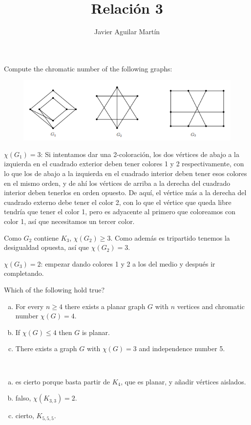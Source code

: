 \documentclass[twoside]{article}
\begin{document}
\title{Relación 3}
\author{Javier Aguilar Martín}
\maketitle


\begin{ejercicio}{3.1}
Compute the chromatic number of the following graphs:

\begin{figure}[h!]
\includegraphics[scale=0.7]{grafos31}
\end{figure}
\end{ejercicio}
\begin{solucion}
$\chi(G_1)=3$: Si intentamos dar una 2-coloración, los dos vértices de abajo a la izquierda en el cuadrado exterior deben tener colores 1 y 2 respectivamente, con lo que los de abajo a la izquierda en el cuadrado interior deben tener esos colores en el mismo orden, y de ahí los vértices de arriba a la derecha del cuadrado interior deben tenerlos en orden opuesto. De aquí, el vértice más a la derecha del cuadrado externo debe tener el color 2, con lo que el vértice que queda libre tendría que tener el color 1, pero es adyacente al primero que coloreamos con color 1, así que necesitamos un tercer color. 

Como $G_2$ contiene $K_3$, $\chi(G_2)\geq 3$. Como además es tripartido tenemos la desigualdad opuesta, así que $\chi(G_2)=3$. 

$\chi(G_3)=2$: empezar dando colores 1 y 2 a los del medio y después ir completando. 
\end{solucion}

\newpage


\begin{ejercicio}{3.2}
Which of the following hold true?
\begin{enumerate}[a)]
\item For every $n ≥ 4$ there exists a planar graph $G$ with $n$ vertices and chromatic
number $χ(G) = 4$.
\item If $χ(G) ≤ 4$ then $G$ is planar.
\item There exists a graph $G$ with $χ(G) = 3$ and independence number 5.
\end{enumerate}
\end{ejercicio}
\begin{solucion}\
\begin{enumerate}[a)]
\item es cierto porque basta partir de $K_4$, que es planar, y añadir vértices aislados.
\item falso, $\chi(K_{3,3})=2$. 
\item cierto, $K_{5,5,5}$.  
\end{enumerate}

\end{solucion}
\end{document}
